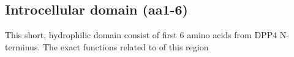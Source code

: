 \subsection{Introcellular domain (aa1-6)}

This short, hydrophilic domain consist of first 6 amino acids from DPP4 N-terminus. The exact functions related to of this region 